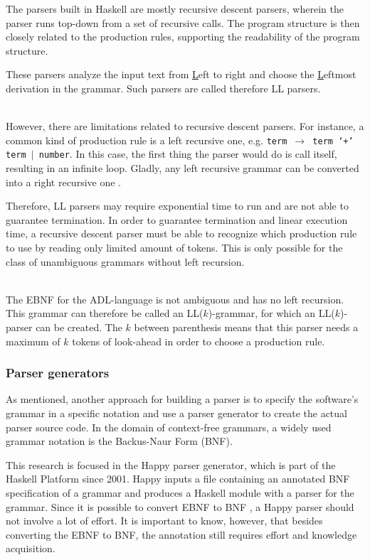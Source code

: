 The parsers built in Haskell are mostly recursive descent parsers, wherein the parser runs top-down from a set of recursive calls.
The program structure is then closely related to the production rules, supporting the readability of the program structure.

These parsers analyze the input text from \underline{L}eft to right and choose the \underline{L}eftmost derivation in the grammar.
Such parsers are called therefore LL parsers.

~\\
However, there are limitations related to recursive descent parsers.
For instance, a common kind of production rule is a left recursive one, e.g. \texttt{term $\rightarrow$ term `$+$' term $|$ number}.
In this case, the first thing the parser would do is call itself, resulting in an infinite loop.
Gladly, any left recursive grammar can be converted into a right recursive one \cite{remove-left}.

Therefore, LL parsers may require exponential time to run and are not able to guarantee termination.
In order to guarantee termination and linear execution time, a recursive descent parser must be able to recognize which production rule to use by reading only limited amount of tokens.
This is only possible for the class of unambiguous grammars without left recursion.

~\\
%
%
The EBNF for the ADL-language is not ambiguous and has no left recursion.
This grammar can therefore be called an LL($k$)-grammar, for which an LL($k$)-parser can be created.
The $k$ between parenthesis means that this parser needs a maximum of $k$ tokens of look-ahead in order to choose a production rule.

\subsubsection{Parser generators}
As mentioned, another approach for building a parser is to specify the software's grammar in a specific notation and use a parser generator to create the actual parser source code.
In the domain of context-free grammars, a widely used grammar notation is the Backus-Naur Form (BNF).

%
This research is focused in the Happy parser generator, which is part of the Haskell Platform since 2001.
Happy inputs a file containing an annotated BNF specification of a grammar and produces a Haskell module with a parser for the grammar.
Since it is possible to convert EBNF to BNF \cite{convert-ebnf,bnf-ebnf}, a Happy parser should not involve a lot of effort.
It is important to know, however, that besides converting the EBNF to BNF, the annotation still requires effort and knowledge acquisition.


